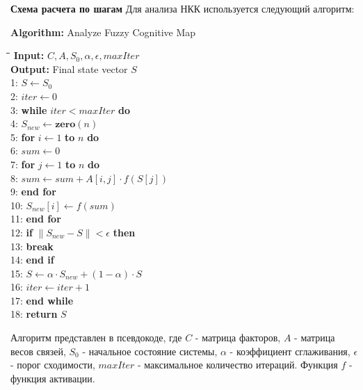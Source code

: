 \documentclass{article}
\begin{document}
    \textbf{Схема расчета по шагам}
    Для анализа НКК используется следующий алгоритм:

    \textbf{Algorithm:} Analyze Fuzzy Cognitive Map

    \begin{tabbing}
        \hspace*{2em}\= \hspace*{2em}\= \hspace*{2em}\= \kill
        \textbf{Input:} $C, A, S_0, \alpha, \epsilon, maxIter$ \\
        \textbf{Output:} Final state vector $S$ \\
        1: \> $S \gets S_0$ \\
        2: \> $iter \gets 0$ \\
        3: \> \textbf{while} $iter < maxIter$ \textbf{do} \\
        4: \> \> $S_{new} \gets \textbf{zero}(n)$ \\
        5: \> \> \textbf{for} $i \gets 1$ \textbf{to} $n$ \textbf{do} \\
        6: \> \> \> $sum \gets 0$ \\
        7: \> \> \> \textbf{for} $j \gets 1$ \textbf{to} $n$ \textbf{do} \\
        8: \> \> \> \> $sum \gets sum + A[i, j] \cdot f(S[j])$ \\
        9: \> \> \> \textbf{end for} \\
        10: \> \> \> $S_{new}[i] \gets f(sum)$ \\
        11: \> \> \textbf{end for} \\
        12: \> \> \textbf{if} $\|S_{new} - S\| < \epsilon$ \textbf{then} \\
        13: \> \> \> \textbf{break} \\
        14: \> \> \textbf{end if} \\
        15: \> \> $S \gets \alpha \cdot S_{new} + (1 - \alpha) \cdot S$ \\
        16: \> \> $iter \gets iter + 1$ \\
        17: \> \textbf{end while} \\
        18: \> \textbf{return} $S$ \\
    \end{tabbing}
    Алгоритм представлен в псевдокоде, где $C$ - матрица факторов, $A$ - матрица весов связей, $S_0$ - начальное состояние системы, $\alpha$ - коэффициент сглаживания, $\epsilon$ - порог сходимости, $maxIter$ - максимальное количество итераций. Функция $f$ - функция активации.\\
\end{document}
